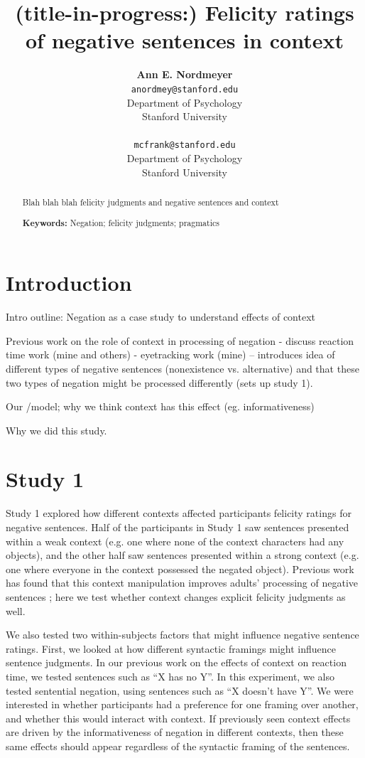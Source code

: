 \documentclass[10pt,letterpaper]{article}
\title{(title-in-progress:) Felicity ratings of negative sentences in context}
\author{{\large \bf Ann E. Nordmeyer} \\ \texttt{anordmey@stanford.edu}\\ Department of Psychology \\ Stanford University \\ 
\And {\large \bf Michael C. Frank} \\ \texttt{mcfrank@stanford.edu} \\ Department of Psychology \\ Stanford University \\ }
\begin{document}
\maketitle


\begin{abstract}
Blah blah blah felicity judgments and negative sentences and context

\textbf{Keywords:} 
Negation; felicity judgments; pragmatics
\end{abstract}

\section{Introduction}

Intro outline:
Negation as a case study to understand effects of context

Previous work on the role of context in processing of negation
	- discuss reaction time work (mine and others)
	- eyetracking work (mine) -- introduces idea of different types of negative sentences (nonexistence vs. alternative) and that these two types of negation might be processed differently (sets up study 1).

Our /model; why we think context has this effect (eg. informativeness)

Why we did this study.
\section{Study 1}

Study 1 explored how different contexts affected participants felicity ratings for negative sentences.  Half of the participants in Study 1 saw sentences presented within a weak context (e.g. one where none of the context characters had any objects), and the other half saw sentences presented within a strong context (e.g. one where everyone in the context possessed the negated object).  Previous work has found that this context manipulation improves adults' processing of negative sentences \cite{nordmeyer2014}; here we test whether context changes explicit felicity judgments as well.  

We also tested two within-subjects factors that might influence negative sentence ratings.  First, we looked at how different syntactic framings might influence sentence judgments.  In our previous work on the effects of context on reaction time, we tested sentences such as ``X has no Y''.  In this experiment, we also tested sentential negation, using sentences such as ``X doesn't have Y''.  We were interested in whether participants had a preference for one framing over another, and whether this would interact with context.  If previously seen context effects are driven by the informativeness of negation in different contexts, then these same effects should appear regardless of the syntactic framing of the sentences.  
\end{document}
